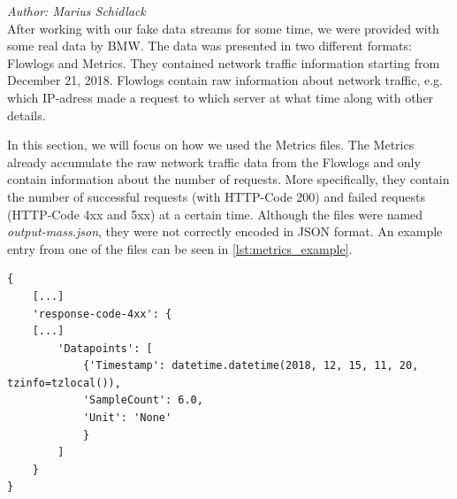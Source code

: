 \label{sec:fixed_data}
\textit{Author: Marius Schidlack} \\
After working with our fake data streams for some time, we were provided with some real data by BMW. The data was presented in two different formats: Flowlogs and Metrics. They contained network traffic information  starting from December 21, 2018. 
Flowlogs contain raw information about network traffic, e.g. which IP-adress made a request to which server at what time along with other details.

In this section, we will focus on how we used the Metrics files. The Metrics already accumulate the raw network traffic data from the Flowlogs and only contain information about the number of requests. More specifically, they contain the number of successful requests (with HTTP-Code 200) and failed requests (HTTP-Code 4xx and 5xx) at a certain time. Although the files were named \textit{output-mass.json}, they were not correctly encoded in JSON format. An example entry from one of the files can be seen in \ref{lst:metrics_example}.

\begin{minipage}{\linewidth}
\begin{lstlisting}[caption={Example entry from metrics data},label={lst:metrics_example}]
{
    [...]
    'response-code-4xx': {
    [...]
        'Datapoints': [
            {'Timestamp': datetime.datetime(2018, 12, 15, 11, 20, tzinfo=tzlocal()), 
            'SampleCount': 6.0, 
            'Unit': 'None'
            }
        ]
    }
}
\end{lstlisting}
\end{minipage}

